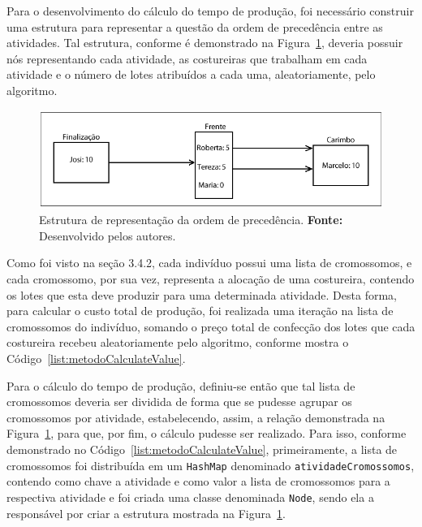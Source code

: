 \par Para o desenvolvimento do cálculo do tempo de produção, foi necessário construir uma estrutura para representar a 
questão da ordem de precedência entre as atividades. Tal estrutura, conforme é demonstrado na Figura~\ref{fig:montagem_node}, 
deveria possuir nós representando cada atividade, as costureiras que trabalham em cada atividade e o número de lotes atribuídos a 
cada uma, aleatoriamente, pelo algoritmo.



\begin{figure}[h!]
	\centerline{\includegraphics[scale=1.1]{./imagens/montagem_node.png}}
	\caption[Estrutura de representação da ordem de precedência.]
	{Estrutura de representação da ordem de precedência. \textbf{Fonte:}
	Desenvolvido pelos autores.}
	\label{fig:montagem_node}
\end{figure}


\par Como foi visto na seção 3.4.2, cada indivíduo possui uma lista de
cromossomos, e cada cromossomo, por sua vez, representa a alocação de uma
costureira, contendo os lotes que esta deve produzir para uma determinada atividade.
Desta forma, para calcular o custo total de produção, foi realizada uma iteração 
na lista de cromossomos do indivíduo, somando o preço total de confecção dos lotes
que cada costureira recebeu aleatoriamente pelo algoritmo, conforme mostra o Código~\ref{list:metodoCalculateValue}.

\par Para o cálculo do tempo de produção, definiu-se então que tal lista de cromossomos deveria ser
dividida de forma que se pudesse agrupar os cromossomos por atividade, estabelecendo, assim, a relação 
demonstrada na Figura~\ref{fig:montagem_node}, para que,
por fim, o cálculo pudesse ser realizado.
Para isso, conforme demonstrado no Código~\ref{list:metodoCalculateValue}, primeiramente, a lista de 
cromossomos foi distribuída em um \texttt{HashMap} denominado \texttt{atividadeCromossomos}, contendo 
como chave a atividade e como valor a lista de cromossomos para a respectiva atividade e foi criada uma 
classe denominada \texttt{Node}, sendo ela a responsável por criar a estrutura
mostrada na Figura~\ref{fig:montagem_node}.


